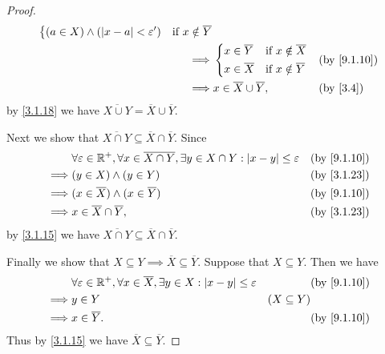 \begin{proof}
\begin{align*}
\begin{dcases}
			           (a \in X) \land (\abs{x - a} < \varepsilon') & \text{if } x \notin \overline{Y}
		           \end{dcases}                                                         \\
		\implies & \begin{dcases}
			           x \in \overline{Y} & \text{if } x \notin \overline{X} \\
			           x \in \overline{X} & \text{if } x \notin \overline{Y}
		           \end{dcases}                                                               &  & \by{9.1.10}                                             \\
		\implies & x \in \overline{X} \cup \overline{Y},                                                                                  &  & \by{3.4}
	\end{align*}
	by \cref{3.1.18} we have \(\overline{X \cup Y} = \overline{X} \cup \overline{Y}\).

	Next we show that \(\overline{X \cap Y} \subseteq \overline{X} \cap \overline{Y}\).
	Since
	\begin{align*}
		         & \forall \varepsilon \in \R^+, \forall x \in \overline{X \cap Y}, \exists y \in X \cap Y : \abs{x - y} \leq \varepsilon &  & \by{9.1.10} \\
		\implies & (y \in X) \land (y \in Y)                                                                                              &  & \by{3.1.23} \\
		\implies & (x \in \overline{X}) \land (x \in \overline{Y})                                                                        &  & \by{9.1.10} \\
		\implies & x \in \overline{X} \cap \overline{Y},                                                                                  &  & \by{3.1.23}
	\end{align*}
	by \cref{3.1.15} we have \(\overline{X \cap Y} \subseteq \overline{X} \cap \overline{Y}\).

	Finally we show that \(X \subseteq Y \implies \overline{X} \subseteq \overline{Y}\).
	Suppose that \(X \subseteq Y\).
	Then we have
	\begin{align*}
		         & \forall \varepsilon \in \R^+, \forall x \in \overline{X}, \exists y \in X : \abs{x - y} \leq \varepsilon &                 & \by{9.1.10} \\
		\implies & y \in Y                                                                                                  & (X \subseteq Y)               \\
		\implies & x \in \overline{Y}.                                                                                      &                 & \by{9.1.10}
	\end{align*}
	Thus by \cref{3.1.15} we have \(\overline{X} \subseteq \overline{Y}\).
\end{proof}

